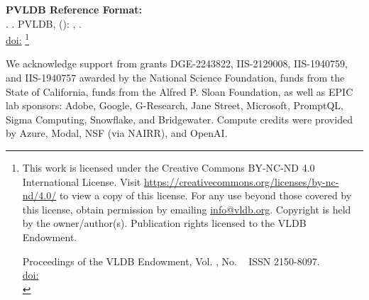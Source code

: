 \documentclass[sigconf, nonacm]{acmart}
\begin{document}
\pagestyle{\vldbpagestyle}
\begingroup\small\noindent\raggedright\textbf{PVLDB Reference Format:}\\
\vldbauthors. \vldbtitle. PVLDB, \vldbvolume(\vldbissue): \vldbpages, \vldbyear.\\
\href{https://doi.org/\vldbdoi}{doi:\vldbdoi}
\endgroup
\begingroup
\renewcommand\thefootnote{}\footnote{\noindent
This work is licensed under the Creative Commons BY-NC-ND 4.0 International License. Visit \url{https://creativecommons.org/licenses/by-nc-nd/4.0/} to view a copy of this license. For any use beyond those covered by this license, obtain permission by emailing \href{mailto:info@vldb.org}{info@vldb.org}. Copyright is held by the owner/author(s). Publication rights licensed to the VLDB Endowment. \\
\raggedright Proceedings of the VLDB Endowment, Vol. \vldbvolume, No. \vldbissue\ %
ISSN 2150-8097. \\
\href{https://doi.org/\vldbdoi}{doi:\vldbdoi} \\
}\addtocounter{footnote}{-1}\endgroup











\begin{acks}
We acknowledge support from grants DGE-2243822, IIS-2129008, IIS-1940759, and IIS-1940757 awarded by the National Science Foundation, funds from the State of California, funds from the Alfred P. Sloan Foundation, as well as EPIC lab sponsors: Adobe, Google, G-Research, Jane Street, Microsoft, PromptQL, Sigma Computing, Snowflake, and Bridgewater. Compute credits were provided by Azure, Modal, NSF (via NAIRR), and OpenAI. 
\end{acks}
\balance



\sigmod{\appendixtext{\newpage}}
\end{document}
